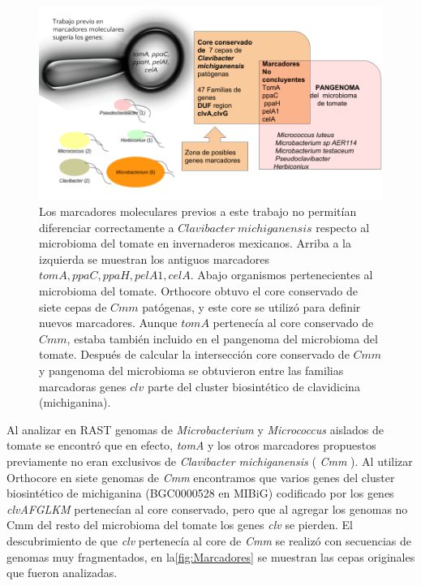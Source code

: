 \documentclass[]{article}
\begin{document}
\begin{figure}[h!tbp]
\centering
\includegraphics[angle = 0,scale = .5]{chapter1/Marcadores-Clavibacter.png}
\caption[Los genes del cluster biosintético clv son marcadores de $Clavibacter$]{\footnotesize{Los marcadores moleculares previos a este trabajo no permitían diferenciar correctamente a $Clavibacter~michiganensis$ respecto al microbioma del tomate en invernaderos mexicanos. Arriba a la izquierda se muestran los antiguos marcadores $tomA, ppaC, ppaH, pelA1, celA$. Abajo organismos pertenecientes al microbioma del tomate. Orthocore obtuvo el core conservado de siete cepas de $Cmm$ patógenas, y este core se utilizó para definir nuevos marcadores. Aunque $tomA$ pertenecía al core conservado de $Cmm$, estaba también incluido en el pangenoma del microbioma del tomate. Después de calcular la intersección core conservado de $Cmm$ y pangenoma del microbioma se obtuvieron entre las familias marcadoras genes $clv$ parte del cluster biosintético de clavidicina (michiganina).}}
\label{fig:Marcadores}
\end{figure}

Al analizar en RAST genomas de \emph{Microbacterium} y
\emph{Micrococcus} aislados de tomate se encontró que en efecto,
\emph{tomA} y los otros marcadores propuestos previamente no eran
exclusivos de \emph{Clavibacter michiganensis} ( \emph{Cmm} ). Al
utilizar Orthocore en siete genomas de \emph{Cmm} encontramos que varios
genes del cluster biosintético de michiganina (BGC0000528 en MIBiG)
codificado por los genes \emph{clvAFGLKM} pertenecían al core
conservado, pero que al agregar los genomas no Cmm del resto del
microbioma del tomate los genes \emph{clv} se pierden. El descubrimiento
de que \emph{clv} pertenecía al core de \emph{Cmm} se realizó con
secuencias de genomas muy fragmentados, en la\autoref{fig:Marcadores} se
muestran las cepas originales que fueron analizadas.
\end{document}
